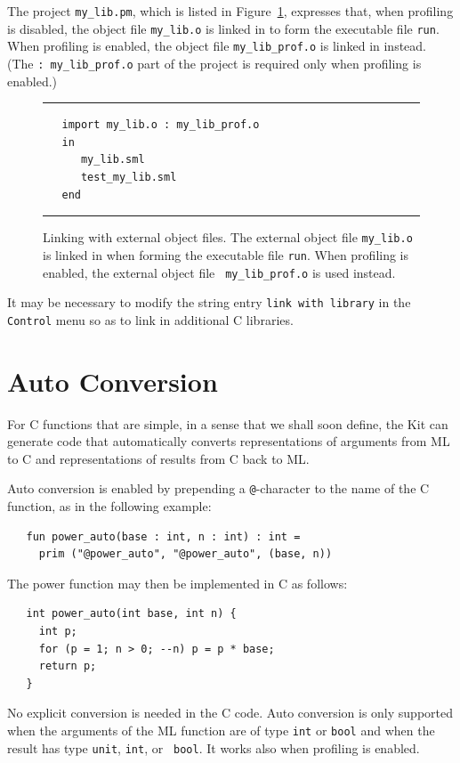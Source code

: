 \documentclass[12pt]{book}
\begin{document}
The project \verb|my_lib.pm|, which is listed in Figure~\ref{my_lib.pm.fig},
expresses that, when profiling is disabled, the object file
\verb|my_lib.o| is linked in to form the executable file {\tt run}.
When profiling is enabled, the object file \verb|my_lib_prof.o| is
linked in instead. (The \verb|: my_lib_prof.o| part of the project is
required only when profiling is enabled.)
\begin{figure}
\hrule \medskip
\begin{verbatim}
   import my_lib.o : my_lib_prof.o
   in 
      my_lib.sml 
      test_my_lib.sml
   end
\end{verbatim}
\caption{Linking with external object files. The external object 
  file {\tt my\_lib.o} is linked in when forming the executable file
  {\tt run}. When profiling is enabled, the external object file {\tt
    my\_lib\_prof.o} is used instead.}
\label{my_lib.pm.fig}
\medskip \hrule
\end{figure}

It may be necessary to modify the string entry \texttt{link with
  library} in the {\tt Control} menu so as to link in additional C
libraries.

\section{Auto Conversion} 
% 
For C functions that are simple, in a sense
that we shall soon define, the Kit can generate code that
automatically converts representations of arguments from ML to C and
representations of results from C back to ML.

Auto conversion is enabled by prepending a {\tt @}-character to
the name of the C function, as in the following example:
\begin{verbatim}
   fun power_auto(base : int, n : int) : int = 
     prim ("@power_auto", "@power_auto", (base, n))
\end{verbatim}

\noindent
The power function may then be implemented in C as follows:
\begin{verbatim}
   int power_auto(int base, int n) {
     int p;
     for (p = 1; n > 0; --n) p = p * base;
     return p;
   }
\end{verbatim}

\noindent
No explicit conversion is needed in the C code. Auto conversion is only
supported when the arguments of the ML function are of type {\tt int} or
{\tt bool} and when the result has type {\tt unit}, {\tt int}, or {\tt
  bool}. It works also when profiling is enabled.
\end{document}
